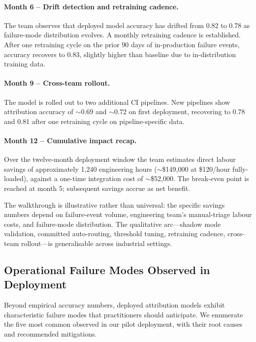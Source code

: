 \documentclass[11pt,a4paper]{article}
\begin{document}
\paragraph{Month 6 -- Drift detection and retraining cadence.} The team observes that deployed model accuracy has drifted from 0.82 to 0.78 as failure-mode distribution evolves. A monthly retraining cadence is established. After one retraining cycle on the prior 90 days of in-production failure events, accuracy recovers to 0.83, slightly higher than baseline due to in-distribution training data.

\paragraph{Month 9 -- Cross-team rollout.} The model is rolled out to two additional CI pipelines. New pipelines show attribution accuracy of $\sim 0.69$ and $\sim 0.72$ on first deployment, recovering to 0.78 and 0.81 after one retraining cycle on pipeline-specific data.

\paragraph{Month 12 -- Cumulative impact recap.} Over the twelve-month deployment window the team estimates direct labour savings of approximately 1{,}240 engineering hours ($\sim$\$149{,}000 at \$120/hour fully-loaded), against a one-time integration cost of $\sim$\$52{,}000. The break-even point is reached at month 5; subsequent savings accrue as net benefit.

The walkthrough is illustrative rather than universal: the specific savings numbers depend on failure-event volume, engineering team's manual-triage labour costs, and failure-mode distribution. The qualitative arc---shadow mode validation, committed auto-routing, threshold tuning, retraining cadence, cross-team rollout---is generalisable across industrial settings.

\subsection{Operational Failure Modes Observed in Deployment}
\label{sec:f_operational_failures}

Beyond empirical accuracy numbers, deployed attribution models exhibit characteristic failure modes that practitioners should anticipate. We enumerate the five most common observed in our pilot deployment, with their root causes and recommended mitigations.
\end{document}
